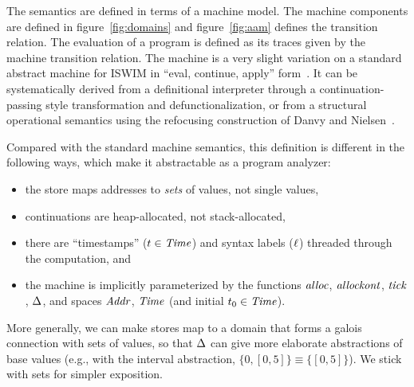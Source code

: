 \documentclass[preprint,onecolumn,9pt]{sigplanconf} %
\begin{document}
The semantics are defined in terms of a machine model.  The machine
components are defined in figure~\ref{fig:domains} and
figure~\ref{fig:aam} defines the transition relation.  The evaluation
of a program is defined as its traces given by the machine transition relation.  The
machine is a very slight variation on a standard abstract machine for
ISWIM in ``eval, continue, apply'' form~\cite{dvanhorn:Danvy:DSc}.  It
can be systematically derived from a definitional interpreter through
a continuation-passing style transformation and defunctionalization,
or from a structural operational semantics using the refocusing
construction of Danvy and
Nielsen~\cite{dvanhorn:Danvy-Nielsen:RS-04-26}.

Compared with the standard machine semantics, this definition is
different in the following ways, which make it abstractable as a
program analyzer:
\begin{itemize}
\item the store maps addresses to \emph{sets} of values, not
  single values,
\item continuations are heap-allocated, not stack-allocated,
\item there are ``timestamps'' (${t} \in \mathit{Time}$) and syntax
  labels (${\ell}$) threaded through the computation, and
\item the machine is implicitly parameterized by the functions
  $\mathit{alloc}$, $\mathit{allockont}$, $\mathit{tick}$, $\Delta$, and spaces
  $\mathit{Addr}$, $\mathit{Time}$ (and initial ${t}_0 \in \mathit{Time}$).
\end{itemize}

More generally, we can make stores map to a domain that forms a galois
connection with sets of values, so that $\Delta$ can give more
elaborate abstractions of base values (e.g., with the interval
abstraction, $\{0,[0,5]\} \equiv \{[0,5]\}$). We stick with sets for
simpler exposition.
\end{document}
